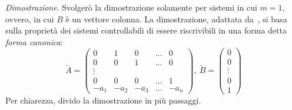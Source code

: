 \emph{Dimostrazione}.
Svolgerò la dimostrazione solamente per sistemi in cui $m = 1$, ovvero,
in cui $B$ è un vettore colonna.
La dimostrazione, adattata da~\cite{luenberger1979introduction}, si basa sulla proprietà dei sistemi controllabili
di essere riscrivibili in una forma detta \emph{forma canonica}:
\begin{equation}
    \tilde A = \left(
        \begin{array}{ccccc}
            0 &1 &0 &\ldots &0 \\
            0 &0 &1 &\ldots &0 \\
            \vdots & & & & \\
            0 &0 &0 &\ldots &1 \\
            -a_1 &-a_2 &-a_3 &\ldots &-a_n
        \end{array}
    \right),\ \tilde B = \left(
    \begin{array}{c}
        0 \\
        0 \\
        \vdots \\
        0 \\
        1
    \end{array}
    \right)
    \label{eq:forma-canonica}
\end{equation}
Per chiarezza, divido la dimostrazione in più passaggi.
